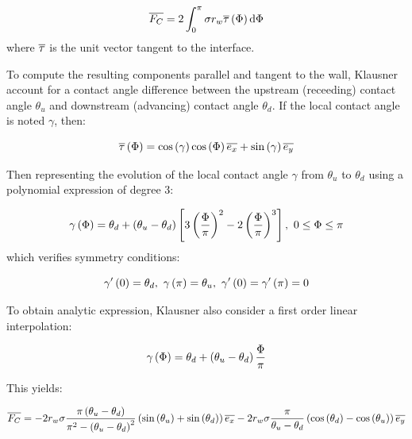 \begin{equation}
\overline{F_{C}} = 2 \int_{0}^{\pi} \sigma r_{w} \overline{\tau}\left( \Phi \right) \mathrm{d}\Phi
\end{equation}
where $\overline{\tau}$ is the unit vector tangent to the interface.

To compute the resulting components parallel and tangent to the wall, Klausner \etal \cite{klausner_vapor_1993} account for a contact angle difference between the upstream (receeding) contact angle $\theta_{u}$ and downstream (advancing) contact angle $\theta_{d}$. If the local contact angle is noted $\gamma$, then:

\begin{equation}
\overline{\tau}\left( \Phi \right) = \mathrm{cos}\left( \gamma \right) \mathrm{cos}\left( \Phi \right) \overline{e_{x}} + \mathrm{sin}\left( \gamma \right) \overline{e_{y}}
\end{equation}

Then representing the evolution of the local contact angle $\gamma$ from $\theta_{u}$ to $\theta_{d}$ using a polynomial expression of degree 3:


\begin{equation}
\gamma\left( \Phi \right) = \theta_{d} + \left( \theta_{u} - \theta_{d} \right) \left[ 3\left( \frac{\Phi}{ \pi} \right)^{2} - 2\left( \frac{\Phi}{\pi} \right)^{3} \right],\ 0 \leq \Phi \leq \pi
\label{eq:forces_klausner_poly_deg3}
\end{equation}
which verifies symmetry conditions:

\begin{equation}
\gamma'\parth{0} = \theta_{d},\ \gamma\parth{\pi} = \theta_{u},\ \gamma'\parth{0}=\gamma'\parth{\pi}=0
\end{equation}

To obtain analytic expression, Klausner \etal also consider a first order linear interpolation:

\begin{equation}
\gamma\left( \Phi \right) = \theta_{d} + \left( \theta_{u}-\theta_{d} \right)\frac{\Phi}{\pi}
\end{equation}

This yields:

\begin{equation}
\overline{F_{C}}=-2r_{w}\sigma \frac{\pi\left( \theta_{u}-\theta_{d} \right)}{\pi^{2}-\left( \theta_{u}-\theta_{d} \right)^{2}}\left( \mathrm{sin}\left( \theta_{u} \right)+\mathrm{sin}\left( \theta_{d} \right)  \right)\overline{e_{x}} - 2r_{w} \sigma \frac{\pi}{\theta_{u}-\theta_{d}}\left( \mathrm{cos}\left( \theta_{d} \right)- \mathrm{cos}\left( \theta_{u} \right) \right)\overline{e_{y}}
\label{eq:forces_FC_klausner_deg1}
\end{equation}

